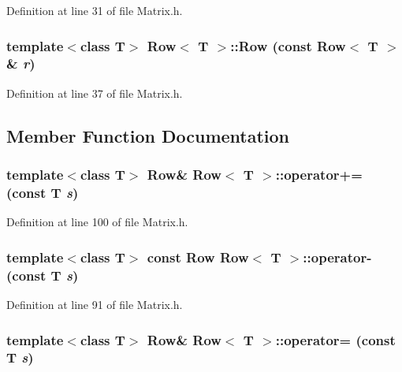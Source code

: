 Definition at line 31 of file Matrix.h.

\hypertarget{classRow_a3c76905ddd4522c92da0d8a9e24a22a1}{
\subsubsection[{Row}]{\setlength{\rightskip}{0pt plus 5cm}template$<$class T$>$ {\bf Row}$<$ T $>$::{\bf Row} (const {\bf Row}$<$ T $>$ \& {\em r})}}
\label{classRow_a3c76905ddd4522c92da0d8a9e24a22a1}


Definition at line 37 of file Matrix.h.



\subsection{Member Function Documentation}
\hypertarget{classRow_a46ffce8561e1869e2a4d3a7ac107469b}{
\subsubsection[{operator+=}]{\setlength{\rightskip}{0pt plus 5cm}template$<$class T$>$ {\bf Row}\& {\bf Row}$<$ T $>$::operator+= (const T {\em s})}}
\label{classRow_a46ffce8561e1869e2a4d3a7ac107469b}


Definition at line 100 of file Matrix.h.

\hypertarget{classRow_a0f6c09f74d0ab002c9af9ad0dfd89399}{
\subsubsection[{operator-\/}]{\setlength{\rightskip}{0pt plus 5cm}template$<$class T$>$ const {\bf Row} {\bf Row}$<$ T $>$::operator-\/ (const T {\em s})}}
\label{classRow_a0f6c09f74d0ab002c9af9ad0dfd89399}


Definition at line 91 of file Matrix.h.

\hypertarget{classRow_a1511d921c037da716d3ca7b6da79ab94}{
\subsubsection[{operator=}]{\setlength{\rightskip}{0pt plus 5cm}template$<$class T$>$ {\bf Row}\& {\bf Row}$<$ T $>$::operator= (const T {\em s})}}
\label{classRow_a1511d921c037da716d3ca7b6da79ab94}


